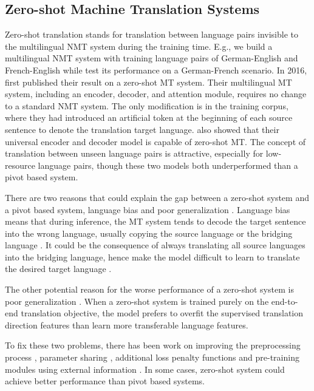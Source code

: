 \documentclass[thesis,fonts=libertine]{cluu}
\begin{document}
\subsection{Zero-shot Machine Translation Systems}
\label{sec:zero_shot_mt}

Zero-shot translation stands for translation between language pairs invisible to the multilingual NMT system during the training time. E.g., we build a multilingual NMT system with training language pairs of German-English and French-English while test its performance on a German-French scenario. In 2016, \textcite{Johnson:2016aa} first published their result on a zero-shot MT system. Their multilingual MT system, including an encoder, decoder, and attention module, requires no change to a standard NMT system. The only modification is in the training corpus, where they had introduced an artificial token at the beginning of each source sentence to denote the translation target language. \textcite{Ha:2016aa} also showed that their universal encoder and decoder model is capable of zero-shot MT. The concept of translation between unseen language pairs is attractive, especially for low-resource language pairs, though these two models both underperformed than a pivot based system.

There are two reasons that could explain the gap between a zero-shot system and a pivot based system, language bias \parencite{Ha:2016aa, Ha:2017aa, Arivazhagan:2019aa} and poor generalization \parencite{Arivazhagan:2019aa}. Language bias means that during inference, the MT system tends to decode the target sentence into the wrong language, usually copying the source language or the bridging language \textcite{Ha:2016aa}. It could be the consequence of always translating all source languages into the bridging language, hence make the model difficult to learn to translate the desired target language \parencite{Arivazhagan:2019aa}.

The other potential reason for the worse performance of a zero-shot system is poor generalization \parencite{Arivazhagan:2019aa}. When a zero-shot system is trained purely on the end-to-end translation objective, the model prefers to overfit the supervised translation direction features than learn more transferable language features.

To fix these two problems, there has been work on improving the preprocessing process \parencite{Lakew:2018aa}, parameter sharing \parencite{Firat:2016aa, Blackwood:2018aa}, additional loss penalty functions \parencite{Arivazhagan:2019aa} and pre-training modules using external information \parencite{Baziotis:2020aa}. In some cases, zero-shot system could achieve better performance than pivot based systems.
\end{document}
